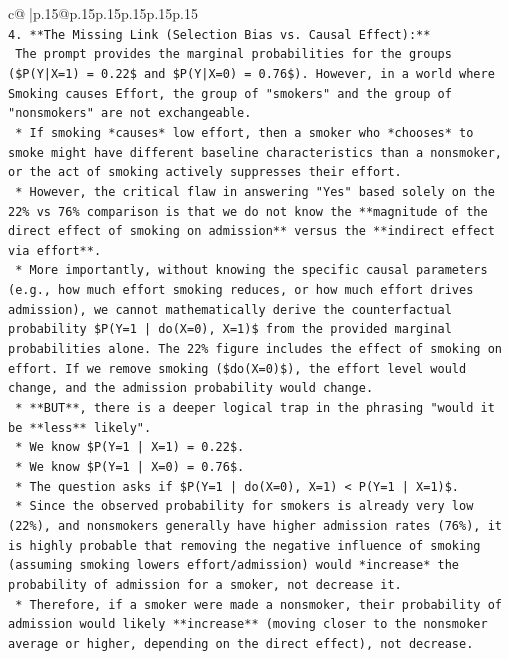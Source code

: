 \documentclass{article}
\begin{document}
{\begin{supertabular}{c@{$\;$}|p{.15\linewidth}@{}p{.15\linewidth}p{.15\linewidth}p{.15\linewidth}p{.15\linewidth}p{.15\linewidth}}
{{{\\ 
\texttt{4.  **The Missing Link (Selection Bias vs. Causal Effect):**} \\
\texttt{    The prompt provides the marginal probabilities for the groups (\$P(Y|X=1) = 0.22\$ and \$P(Y|X=0) = 0.76\$). However, in a world where Smoking causes Effort, the group of "smokers" and the group of "nonsmokers" are not exchangeable.} \\
\texttt{    *   If smoking *causes* low effort, then a smoker who *chooses* to smoke might have different baseline characteristics than a nonsmoker, or the act of smoking actively suppresses their effort.} \\
\texttt{    *   However, the critical flaw in answering "Yes" based solely on the 22\% vs 76\% comparison is that we do not know the **magnitude of the direct effect of smoking on admission** versus the **indirect effect via effort**.} \\
\texttt{    *   More importantly, without knowing the specific causal parameters (e.g., how much effort smoking reduces, or how much effort drives admission), we cannot mathematically derive the counterfactual probability \$P(Y=1 | do(X=0), X=1)\$ from the provided marginal probabilities alone. The 22\% figure includes the effect of smoking on effort. If we remove smoking (\$do(X=0)\$), the effort level would change, and the admission probability would change.} \\
\texttt{    *   **BUT**, there is a deeper logical trap in the phrasing "would it be **less** likely".} \\
\texttt{        *   We know \$P(Y=1 | X=1) = 0.22\$.} \\
\texttt{        *   We know \$P(Y=1 | X=0) = 0.76\$.} \\
\texttt{        *   The question asks if \$P(Y=1 | do(X=0), X=1) < P(Y=1 | X=1)\$.} \\
\texttt{        *   Since the observed probability for smokers is already very low (22\%), and nonsmokers generally have higher admission rates (76\%), it is highly probable that removing the negative influence of smoking (assuming smoking lowers effort/admission) would *increase* the probability of admission for a smoker, not decrease it.} \\
\texttt{        *   Therefore, if a smoker were made a nonsmoker, their probability of admission would likely **increase** (moving closer to the nonsmoker average or higher, depending on the direct effect), not decrease.} \\
}}}
\end{supertabular}}
\end{document}

